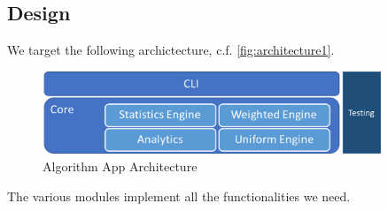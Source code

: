 \documentclass[12pt,a4paper,article]{memoir} %
\begin{document}
\subsection{Design}
\label{ssec:design}
We target the following archictecture, c.f. \autoref{fig:architecture1}.
\begin{figure}[h!]
\begin{center}
\includegraphics[width=0.9\textwidth]{img/architecture1.png}
\caption{Algorithm App Architecture}
\label{fig:architecture1}
\end{center}
\end{figure}
The various modules implement all the functionalities we need.
\end{document}
